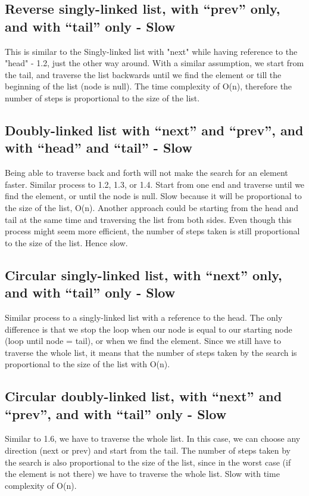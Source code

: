 \documentclass{article}
\begin{document}
\subsection{Reverse singly-linked list, with “prev” only, and with “tail” only - Slow}
This is similar to the Singly-linked list with "next" while having reference to the "head" - 1.2, just the other way around. With a similar assumption, we start from the tail, and traverse the list backwards until we find the element or till the beginning of the list (node is null). The time complexity of O(n), therefore the number of steps is proportional to the size of the list.

\subsection{Doubly-linked list with “next” and “prev”, and with “head” and “tail” - Slow}
Being able to traverse back and forth will not make the search for an element faster. Similar process to 1.2, 1.3, or 1.4. Start from one end and traverse until we find the element, or until the node is null. Slow because it will be proportional to the size of the list, O(n).
Another approach could be starting from the head and tail at the same time and traversing the list from both sides. Even though this process might seem more efficient, the number of steps taken is still proportional to the size of the list. Hence slow.

\subsection{Circular singly-linked list, with “next” only, and with “tail” only - Slow}
Similar process to a singly-linked list with a reference to the head. The only difference is that we stop the loop when our node is equal to our starting node (loop until node = tail), or when we find the element. Since we still have to traverse the whole list, it means that the number of steps taken by the search is proportional to the size of the list with O(n).

\subsection{Circular doubly-linked list, with “next” and “prev”, and with “tail” only - Slow}
Similar to 1.6, we have to traverse the whole list. In this case, we can choose any direction (next or prev) and start from the tail. The number of steps taken by the search is also proportional to the size of the list, since in the worst case (if the element is not there) we have to traverse the whole list. Slow with time complexity of O(n).
\end{document}
